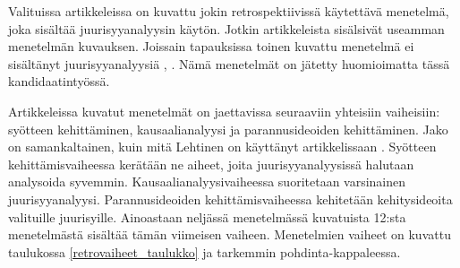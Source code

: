 Valituissa artikkeleissa on kuvattu jokin retrospektiivissä käytettävä menetelmä, joka sisältää juurisyyanalyysin käytön. Jotkin artikkeleista sisälsivät useamman menetelmän kuvauksen. Joissain tapauksissa toinen kuvattu menetelmä ei sisältänyt juurisyyanalyysiä \citep{staalhane2004root}, \citep{dingsoyr2003extending}. Nämä menetelmät on jätetty huomioimatta tässä kandidaatintyössä.

Artikkeleissa kuvatut menetelmät on jaettavissa seuraaviin yhteisiin vaiheisiin: syötteen kehittäminen, kausaalianalyysi ja parannusideoiden kehittäminen. Jako on samankaltainen, kuin mitä Lehtinen on käyttänyt artikkelissaan \citep{Lehtinen2011}. Syötteen kehittämisvaiheessa kerätään ne aiheet, joita juurisyyanalyysissä halutaan analysoida syvemmin. Kausaalianalyysivaiheessa suoritetaan varsinainen juurisyyanalyysi. Parannusideoiden kehittämisvaiheessa kehitetään kehitysideoita valituille juurisyille. Ainoastaan neljässä menetelmässä kuvatuista 12:sta menetelmästä sisältää tämän viimeisen vaiheen. Menetelmien vaiheet on kuvattu taulukossa \ref{retrovaiheet_taulukko} ja tarkemmin pohdinta-kappaleessa.

